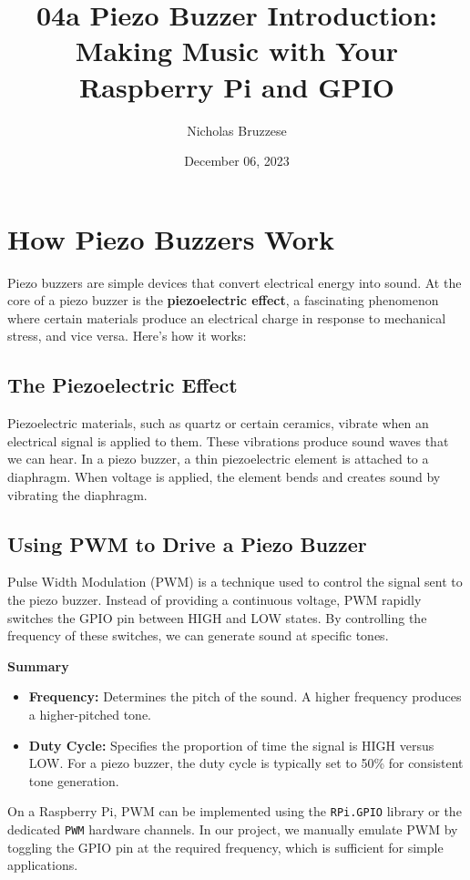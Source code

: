 \documentclass{article}
\title{04a Piezo Buzzer Introduction: Making Music with Your Raspberry Pi and GPIO}
\author{Nicholas Bruzzese}
\date{December 06, 2023}
\begin{document}
	
	\maketitle
	
	\section*{How Piezo Buzzers Work}
	
	Piezo buzzers are simple devices that convert electrical energy into sound. At the core of a piezo buzzer is the \textbf{piezoelectric effect}, a fascinating phenomenon where certain materials produce an electrical charge in response to mechanical stress, and vice versa. Here's how it works:
	
	\subsection*{The Piezoelectric Effect}
	Piezoelectric materials, such as quartz or certain ceramics, vibrate when an electrical signal is applied to them. These vibrations produce sound waves that we can hear. In a piezo buzzer, a thin piezoelectric element is attached to a diaphragm. When voltage is applied, the element bends and creates sound by vibrating the diaphragm.
	
	\subsection*{Using PWM to Drive a Piezo Buzzer}
	Pulse Width Modulation (PWM) is a technique used to control the signal sent to the piezo buzzer. Instead of providing a continuous voltage, PWM rapidly switches the GPIO pin between HIGH and LOW states. By controlling the frequency of these switches, we can generate sound at specific tones.
	
	\textbf{Summary}
	\begin{itemize}
		\item \textbf{Frequency:} Determines the pitch of the sound. A higher frequency produces a higher-pitched tone.
		\item \textbf{Duty Cycle:} Specifies the proportion of time the signal is HIGH versus LOW. For a piezo buzzer, the duty cycle is typically set to 50\% for consistent tone generation.
	\end{itemize}
	
	On a Raspberry Pi, PWM can be implemented using the \texttt{RPi.GPIO} library or the dedicated \texttt{PWM} hardware channels. In our project, we manually emulate PWM by toggling the GPIO pin at the required frequency, which is sufficient for simple applications.
	
\end{document}
